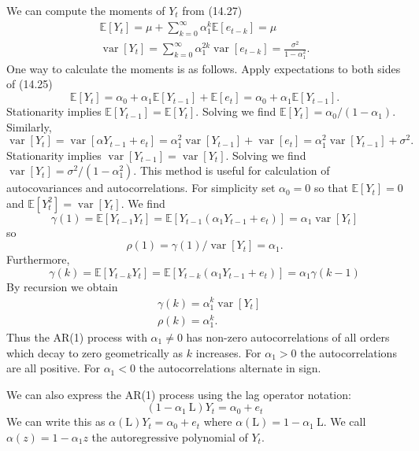 \documentclass[10pt]{article}
\begin{document}
We can compute the moments of $Y_{t}$ from (14.27)
$$
\begin{gathered}
\mathbb{E}\left[Y_{t}\right]=\mu+\sum_{k=0}^{\infty} \alpha_{1}^{k} \mathbb{E}\left[e_{t-k}\right]=\mu \\
\operatorname{var}\left[Y_{t}\right]=\sum_{k=0}^{\infty} \alpha_{1}^{2 k} \operatorname{var}\left[e_{t-k}\right]=\frac{\sigma^{2}}{1-\alpha_{1}^{2}} .
\end{gathered}
$$
One way to calculate the moments is as follows. Apply expectations to both sides of (14.25)
$$
\mathbb{E}\left[Y_{t}\right]=\alpha_{0}+\alpha_{1} \mathbb{E}\left[Y_{t-1}\right]+\mathbb{E}\left[e_{t}\right]=\alpha_{0}+\alpha_{1} \mathbb{E}\left[Y_{t-1}\right] .
$$
Stationarity implies $\mathbb{E}\left[Y_{t-1}\right]=\mathbb{E}\left[Y_{t}\right]$. Solving we find $\mathbb{E}\left[Y_{t}\right]=\alpha_{0} /\left(1-\alpha_{1}\right)$. Similarly,
$$
\operatorname{var}\left[Y_{t}\right]=\operatorname{var}\left[\alpha Y_{t-1}+e_{t}\right]=\alpha_{1}^{2} \operatorname{var}\left[Y_{t-1}\right]+\operatorname{var}\left[e_{t}\right]=\alpha_{1}^{2} \operatorname{var}\left[Y_{t-1}\right]+\sigma^{2} .
$$
Stationarity implies $\operatorname{var}\left[Y_{t-1}\right]=\operatorname{var}\left[Y_{t}\right]$. Solving we find $\operatorname{var}\left[Y_{t}\right]=\sigma^{2} /\left(1-\alpha_{1}^{2}\right)$. This method is useful for calculation of autocovariances and autocorrelations. For simplicity set $\alpha_{0}=0$ so that $\mathbb{E}\left[Y_{t}\right]=0$ and $\mathbb{E}\left[Y_{t}^{2}\right]=\operatorname{var}\left[Y_{t}\right]$. We find
$$
\gamma(1)=\mathbb{E}\left[Y_{t-1} Y_{t}\right]=\mathbb{E}\left[Y_{t-1}\left(\alpha_{1} Y_{t-1}+e_{t}\right)\right]=\alpha_{1} \operatorname{var}\left[Y_{t}\right]
$$
so
$$
\rho(1)=\gamma(1) / \operatorname{var}\left[Y_{t}\right]=\alpha_{1} .
$$
Furthermore,
$$
\gamma(k)=\mathbb{E}\left[Y_{t-k} Y_{t}\right]=\mathbb{E}\left[Y_{t-k}\left(\alpha_{1} Y_{t-1}+e_{t}\right)\right]=\alpha_{1} \gamma(k-1)
$$
By recursion we obtain
$$
\begin{aligned}
&\gamma(k)=\alpha_{1}^{k} \operatorname{var}\left[Y_{t}\right] \\
&\rho(k)=\alpha_{1}^{k} .
\end{aligned}
$$
Thus the AR(1) process with $\alpha_{1} \neq 0$ has non-zero autocorrelations of all orders which decay to zero geometrically as $k$ increases. For $\alpha_{1}>0$ the autocorrelations are all positive. For $\alpha_{1}<0$ the autocorrelations alternate in sign.

We can also express the AR(1) process using the lag operator notation:
$$
\left(1-\alpha_{1} \mathrm{~L}\right) Y_{t}=\alpha_{0}+e_{t}
$$
We can write this as $\alpha(\mathrm{L}) Y_{t}=\alpha_{0}+e_{t}$ where $\alpha(\mathrm{L})=1-\alpha_{1} \mathrm{~L}$. We call $\alpha(z)=1-\alpha_{1} z$ the autoregressive polynomial of $Y_{t}$.
\end{document}
